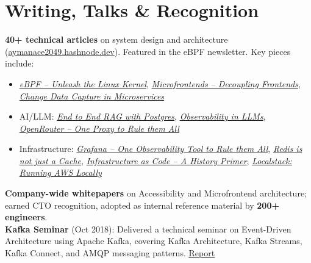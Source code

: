 \documentclass[letterpaper,11pt]{article}
\begin{document}
\section{Writing, Talks \& Recognition}
\small
\textbf{40+ technical articles} on system design and architecture (\href{https://aymanace2049.hashnode.dev}{aymanace2049.hashnode.dev}). Featured in the eBPF newsletter. Key pieces include:
\begin{itemize}[leftmargin=0.2in, label=$\bullet$]
    \item \textit{\href{https://aymanace2049.hashnode.dev/ebpf-unleash-the-linux-kernel}{eBPF -- Unleash the Linux Kernel}}, \textit{\href{https://aymanace2049.hashnode.dev/microfrontends-decoupling-frontends}{Microfrontends -- Decoupling Frontends}}, \textit{\href{https://aymanace2049.hashnode.dev/change-data-capture-capture-data-in-motion-in-your-microservices}{Change Data Capture in Microservices}}
    \item AI/LLM: \textit{\href{https://aymanace2049.hashnode.dev/end-to-end-rag-with-postgres}{End to End RAG with Postgres}}, \textit{\href{https://aymanace2049.hashnode.dev/observability-in-llms}{Observability in LLMs}}, \textit{\href{https://aymanace2049.hashnode.dev/openrouter-one-proxy-to-rule-them-all}{OpenRouter -- One Proxy to Rule them All}}
    \item Infrastructure: \textit{\href{https://aymanace2049.hashnode.dev/grafana-one-observability-tool-to-rule-them-all}{Grafana -- One Observability Tool to Rule them All}}, \textit{\href{https://aymanace2049.hashnode.dev/redis-is-not-just-a-cache}{Redis is not just a Cache}}, \textit{\href{https://aymanace2049.hashnode.dev/infrastructure-as-code-a-history-primer}{Infrastructure as Code -- A History Primer}}, \textit{\href{https://aymanace2049.hashnode.dev/localstack-running-aws-locally}{Localstack: Running AWS Locally}}
\end{itemize}
\textbf{Company-wide whitepapers} on Accessibility and Microfrontend architecture; earned CTO recognition, adopted as internal reference material by \textbf{200+ engineers}. \\[3pt]
\textbf{Kafka Seminar} (Oct 2018): Delivered a technical seminar on Event-Driven Architecture using Apache Kafka, covering Kafka Architecture, Kafka Streams, Kafka Connect, and AMQP messaging patterns. \href{https://drive.google.com/file/d/1txqBQZaRxxT7wu5csBuIHUfi8DrRvUMU/view?usp=sharing}{\underline{Report}}
\end{document}
